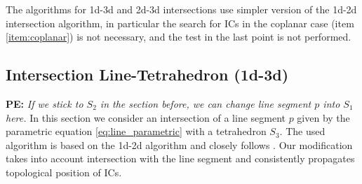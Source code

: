 \documentclass{elsarticle}
\newcommand{\noteJB}[1]{{\color{Blue} \textbf{JB: } \textit{#1}}}
\newcommand{\notePE}[1]{{\color{Orange} \textbf{PE: } \textit{#1}}}
\begin{document}
The algorithms for 1d-3d and 2d-3d intersections use simpler version of the 1d-2d intersection algorithm, in particular the search for ICs in the coplanar case 
(item \ref{item:coplanar}) is not necessary, and the test in the last point is not performed.


\subsection{Intersection Line-Tetrahedron (1d-3d)}
\notePE{If we stick to $S_2$ in the section before, we can change line segment $p$ into $S_1$ here.}
In this section we consider an intersection of a line segment $p$ given by the parametric equation \eqref{eq:line_parametric} with a tetrahedron 
$S_3$. The used algorithm is based on the 1d-2d algorithm and closely follows \cite{platis_fast_2003}. Our modification takes into account
intersection with the line segment and consistently propagates topological position of ICs.
\end{document}
